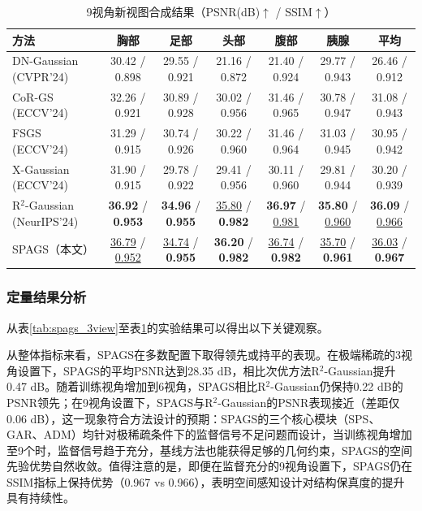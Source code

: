 \begin{table}[htbp]
    \centering
    \caption{9视角新视图合成结果（PSNR(dB)$\uparrow$ / SSIM$\uparrow$）}
    \label{tab:spags_9view}
    \footnotesize
    \begin{tabular*}{\textwidth}{@{\extracolsep{\fill}}lcccccc@{}}
        \toprule
        方法 & 胸部 & 足部 & 头部 & 腹部 & 胰腺 & 平均 \\
        \midrule
        DN-Gaussian (CVPR'24) & 30.42 / 0.898 & 29.55 / 0.921 & 21.16 / 0.872 & 21.40 / 0.924 & 29.77 / 0.943 & 26.46 / 0.912 \\
        CoR-GS (ECCV'24) & 32.26 / 0.921 & 30.89 / 0.928 & 30.02 / 0.956 & 31.46 / 0.965 & 30.78 / 0.947 & 31.08 / 0.943 \\
        FSGS (ECCV'24) & 31.29 / 0.915 & 30.74 / 0.926 & 30.22 / 0.960 & 31.46 / 0.964 & 31.03 / 0.945 & 30.95 / 0.942 \\
        X-Gaussian (ECCV'24) & 31.90 / 0.915 & 29.78 / 0.922 & 29.41 / 0.956 & 30.11 / 0.960 & 29.81 / 0.944 & 30.20 / 0.939 \\
        R$^2$-Gaussian (NeurIPS'24) & \textbf{36.92} / \textbf{0.953} & \textbf{34.96} / \textbf{0.955} & \underline{35.80} / \textbf{0.982} & \textbf{36.97} / \underline{0.981} & \textbf{35.80} / \underline{0.960} & \textbf{36.09} / \underline{0.966} \\
        SPAGS（本文） & \underline{36.79} / \underline{0.952} & \underline{34.74} / \textbf{0.955} & \textbf{36.20} / \textbf{0.982} & \underline{36.74} / \textbf{0.982} & \underline{35.70} / \textbf{0.961} & \underline{36.03} / \textbf{0.967} \\
        \bottomrule
    \end{tabular*}
\end{table}

\subsubsection{定量结果分析}

从表\ref{tab:spags_3view}至表\ref{tab:spags_9view}的实验结果可以得出以下关键观察。

从整体指标来看，SPAGS在多数配置下取得领先或持平的表现。在极端稀疏的3视角设置下，SPAGS的平均PSNR达到28.35 dB，相比次优方法R$^2$-Gaussian提升0.47 dB。随着训练视角增加到6视角，SPAGS相比R$^2$-Gaussian仍保持0.22 dB的PSNR领先；在9视角设置下，SPAGS与R$^2$-Gaussian的PSNR表现接近（差距仅0.06 dB），这一现象符合方法设计的预期：SPAGS的三个核心模块（SPS、GAR、ADM）均针对极稀疏条件下的监督信号不足问题而设计，当训练视角增加至9个时，监督信号趋于充分，基线方法也能获得足够的几何约束，SPAGS的空间先验优势自然收敛。值得注意的是，即便在监督充分的9视角设置下，SPAGS仍在SSIM指标上保持优势（0.967 vs 0.966），表明空间感知设计对结构保真度的提升具有持续性。

